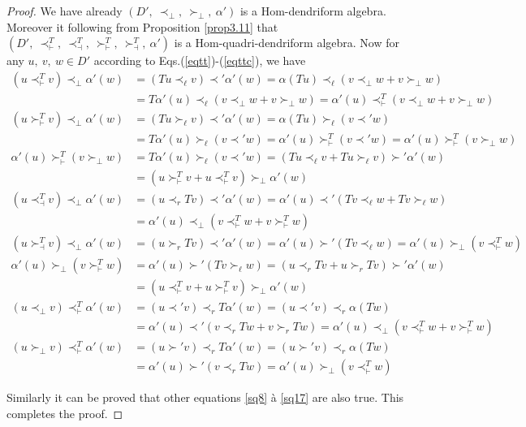 \documentclass[11pt,twoside,reqno]{amsart}
\theoremstyle{plain}
\theoremstyle{definition}
\begin{document}
\begin{proof}
We have already $(D',\  \prec_\perp,\  \succ_\perp,\  \alpha')$ is a Hom-dendriform algebra. Moreover  it following from Proposition \ref{prop3.11} that $(D',\  \prec^{T}_\vdash,\   \prec^T_\dashv,\  \succ^T_\vdash,\  \succ^T_\dashv,\  \alpha')$ 
is a Hom-quadri-dendriform algebra. Now  for any $u,\  v,\  w\in D'$ according to Eqs.(\ref{eqtt})-(\ref{eqttc}), we have
\begin{align*}
(u \prec^T_{\vdash} v) \prec_{\perp} \alpha'(w)
&= (Tu \prec_{\ell} v) \prec' \alpha'(w) 
= \alpha (Tu) \prec_{\ell}(v \prec_{\perp} w + v \succ_{\perp} w) \\
&= T\alpha'(u) \prec_{\ell} (v \prec_{\perp} w + v \succ_{\perp} w) 
= \alpha'(u) \prec^T_{\vdash} (v \prec_{\perp} w + v \succ_{\perp} w) \\
(u \succ^T_{\vdash} v) \prec_{\perp} \alpha'(w)
&= (Tu \succ_{\ell} v) \prec' \alpha'(w) 
= \alpha(Tu) \succ_{\ell} (v \prec' w) \\
&= T\alpha'(u) \succ_{\ell} (v \prec' w) 
= \alpha'(u) \succ^T_{\vdash} (v \prec' w) 
= \alpha'(u) \succ^T_{\vdash}(v \succ_{\perp} w) \\
\alpha'(u) \succ^T_{\vdash}(v \succ_{\perp} w)
&= T\alpha'(u) \succ_{\ell} (v \prec' w) 
= (Tu \prec_{\ell} v + Tu \succ_{\ell} v) \succ' \alpha'(w) \\
&= (u \succ^T_{\vdash} v + u \prec^T_{\vdash} v) \succ_{\perp} \alpha'(w) \\
(u \prec^T_{\dashv} v) \prec_{\perp} \alpha'(w) 
&= (u \prec_{r} Tv) \prec' \alpha'(w) 
= \alpha'(u) \prec' (Tv \prec_{\ell} w + Tv \succ_{\ell} w) \\
&= \alpha'(u) \prec_{\perp} (v \prec^T_{\vdash} w + v \succ^T_{\vdash} w) \\
(u \succ^T_{\dashv} v) \prec_{\perp} \alpha'(w) 
&= (u \succ_{r} Tv) \prec' \alpha'(w) 
= \alpha'(u) \succ' (Tv \prec_{\ell} w) 
= \alpha'(u) \succ_{\perp} (v \prec^T_{\vdash} w) \\
\alpha'(u) \succ_{\perp} (v \succ^T_{\vdash} w) 
&= \alpha'(u) \succ' (Tv \succ_{\ell} w) 
= (u \prec_{r} Tv + u \succ_{r} Tv) \succ' \alpha'(w) \\
&= (u \prec^T_{\vdash} v + u \succ^T_{\vdash} v) \succ_{\perp} \alpha'(w) \\
(u \prec_{\perp} v) \prec^T_{\vdash} \alpha'(w) 
&= (u \prec' v) \prec_{r} T\alpha'(w) 
= (u \prec' v) \prec_{r} \alpha(Tw) \\
&= \alpha'(u) \prec' (v \prec_{r} Tw + v \succ_{r} Tw) 
= \alpha'(u) \prec_{\perp} (v \prec^T_{\vdash} w + v \succ^T_{\vdash} w) \\
(u \succ_{\perp} v) \prec^T_{\vdash} \alpha'(w) 
&= (u \succ' v) \prec_{r} T\alpha'(w) 
= (u \succ' v) \prec_{r} \alpha(Tw) \\
&= \alpha'(u) \succ' (v \prec_{r} Tw) 
= \alpha'(u) \succ_{\perp} (v \prec^T_{\vdash} w)
\end{align*}

Similarly it can be proved that other equations  \ref{sq8} à \ref{sq17} are also true. This completes the proof.
\end{proof}
\end{document}
